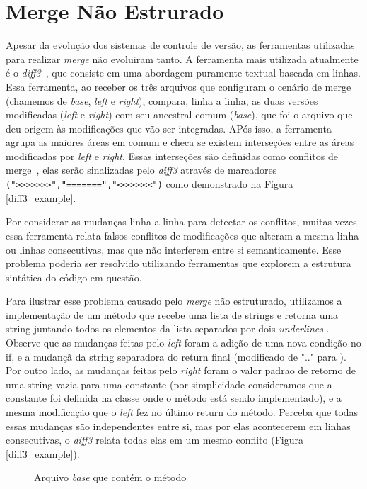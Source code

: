 \section{Merge Não Estrurado}
Apesar da evolução dos sistemas de controle de versão, as ferramentas utilizadas para realizar
\emph{merge} não evoluiram tanto. A ferramenta mais utilizada atualmente é o \emph{diff3}~\cite{mens02}, que consiste em uma
abordagem puramente textual baseada em linhas. Essa ferramenta, ao receber os três arquivos que configuram o cenário de merge
(chamemos de \emph{base}, \emph{left} e \emph{right}), compara, linha a linha, as duas versões modificadas
(\emph{left} e \emph{right}) com seu ancestral comum (\emph{base}), que foi o arquivo que deu origem às modificações
que vão ser integradas. APós isso, a ferramenta agrupa as maiores áreas em comum e checa se existem interseções entre as
áreas modificadas por \emph{left} e \emph{right}. Essas interseções são definidas como conflitos de merge~\cite{khan07},
elas serão sinalizadas pelo \emph{diff3} através de marcadores \verb|(">>>>>>>","=======","<<<<<<<")| como demonstrado na
Figura \ref{diff3_example}.

Por considerar as mudanças linha a linha para detectar os conflitos, muitas vezes essa ferramenta relata falsos conflitos
de modificações que alteram a mesma linha ou linhas consecutivas, mas que não interferem entre si semanticamente.
Esse problema poderia ser resolvido utilizando ferramentas que explorem a estrutura sintática do código em questão.

Para ilustrar esse problema causado pelo \emph{merge} não estruturado, utilizamos a implementação de um método
 que
recebe uma lista de strings e retorna uma string juntando todos os elementos da lista separados por dois
\emph{underlines} . Observe que as mudanças feitas pelo \emph{left} foram a adição de uma nova
condição no if, e a mudançã da string separadora do return final (modificado de ".." para ). Por outro lado,
as mudanças feitas pelo \emph{right} foram o valor padrao de retorno de uma string vazia para uma constante (por simplicidade
consideramos que a constante foi definida na classe onde o método está sendo implementado), e a mesma
modificação que o \emph{left} fez no último return do método. Perceba que todas essas mudanças são independentes entre si,
mas por elas acontecerem em linhas consecutivas, o \emph{diff3} relata todas elas em um mesmo conflito (Figura
\ref{diff3_example}).

\begin{figure}[ht]
	\begin{center}
		
		\caption{Arquivo \emph{base} que contém o método }\label{base_example}
	\end{center}
\end{figure}

